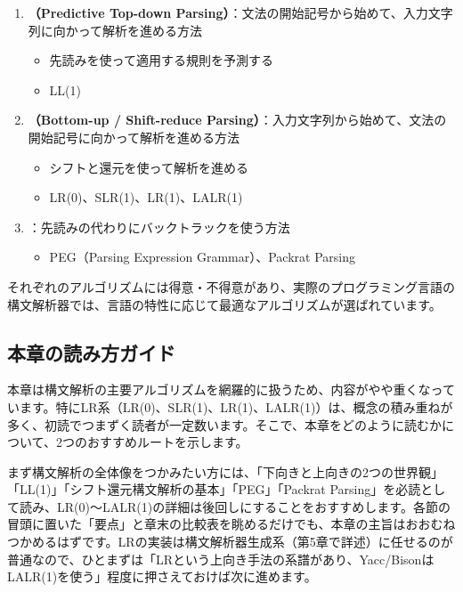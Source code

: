 \begin{enumerate}
\item
  \textbf{\sffamily （Predictive Top-down
  Parsing）}：文法の開始記号から始めて、入力文字列に向かって解析を進める方法

  \begin{itemize}
  \item
    先読みを使って適用する規則を予測する
  \item
    LL(1)
  \end{itemize}
\item
  \textbf{\sffamily （Bottom-up / Shift-reduce
  Parsing）}：入力文字列から始めて、文法の開始記号に向かって解析を進める方法

  \begin{itemize}
    \item
    シフトと還元を使って解析を進める
  \item
    LR(0)、SLR(1)、LR(1)、LALR(1)
  \end{itemize}
\item
  ：先読みの代わりにバックトラックを使う方法

  \begin{itemize}
    \item
    PEG（Parsing Expression Grammar）、Packrat Parsing
  \end{itemize}
\end{enumerate}

それぞれのアルゴリズムには得意・不得意があり、実際のプログラミング言語の構文解析器では、言語の特性に応じて最適なアルゴリズムが選ばれています。

\subsection{本章の読み方ガイド}

本章は構文解析の主要アルゴリズムを網羅的に扱うため、内容がやや重くなっています。特にLR系（LR(0)、SLR(1)、LR(1)、LALR(1)）は、概念の積み重ねが多く、初読でつまずく読者が一定数います。そこで、本章をどのように読むかについて、2つのおすすめルートを示します。

まず構文解析の全体像をつかみたい方には、「下向きと上向きの2つの世界観」「LL(1)」「シフト還元構文解析の基本」「PEG」「Packrat Parsing」を必読として読み、LR(0)〜LALR(1)の詳細は後回しにすることをおすすめします。各節の冒頭に置いた「要点」と章末の比較表を眺めるだけでも、本章の主旨はおおむねつかめるはずです。LRの実装は構文解析器生成系（第5章で詳述）に任せるのが普通なので、ひとまずは「LRという上向き手法の系譜があり、Yacc/BisonはLALR(1)を使う」程度に押さえておけば次に進めます。


